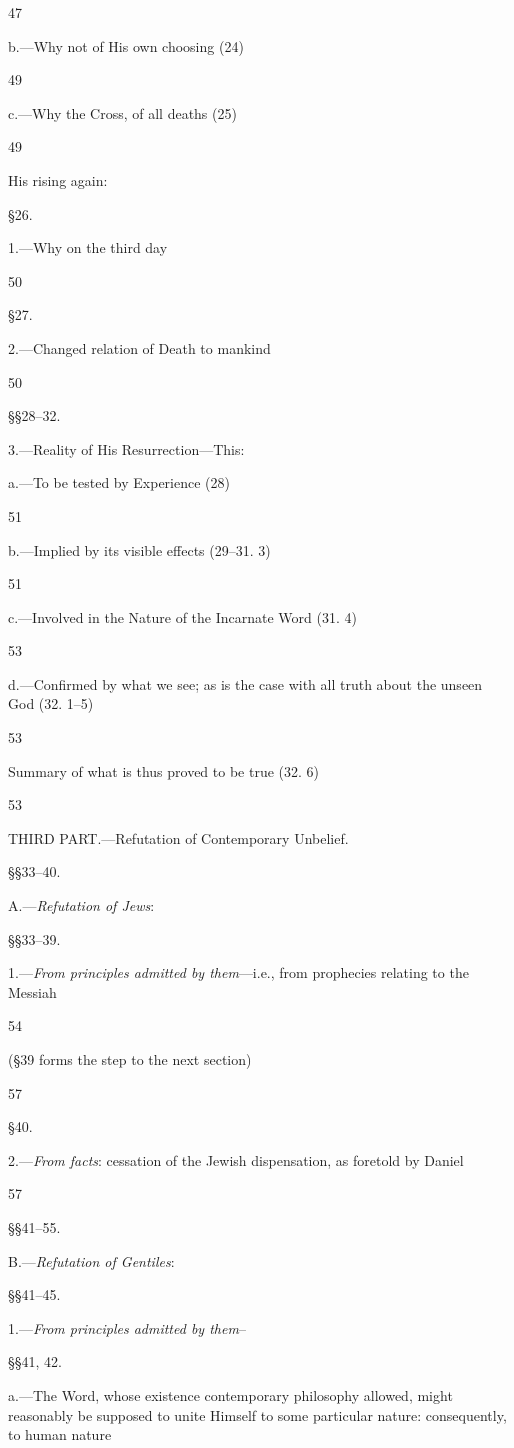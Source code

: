 47

b.—Why not of His own choosing (24)

49

c.—Why the Cross, of all deaths (25)

49

His rising again:

§26.

1.—Why on the third day

50

§27.

2.—Changed relation of Death to mankind

50

§§28–32.

3.—Reality of His Resurrection—This:

a.—To be tested by Experience (28)

51

b.—Implied by its visible effects (29–31. 3)

51

c.—Involved in the Nature of the Incarnate Word (31. 4)

53

d.—Confirmed by what we see; as is the case with all truth about the unseen God (32. 1–5)

53

Summary of what is thus proved to be true (32. 6)

53

THIRD PART.—Refutation of Contemporary Unbelief.

§§33–40.

A.—\emph{Refutation of Jews}:

§§33–39.

1.—\emph{From principles admitted by them}—i.e., from prophecies relating to the Messiah

54

(§39 forms the step to the next section)

57

§40.

2.—\emph{From facts}: cessation of the Jewish dispensation, as foretold by Daniel

57

§§41–55.

B.—\emph{Refutation of Gentiles}:

§§41–45.

1.—\emph{From principles admitted by them}–

§§41, 42.

a.—The Word, whose existence contemporary philosophy allowed, might reasonably be supposed to unite Himself to some particular nature: consequently, to human nature

